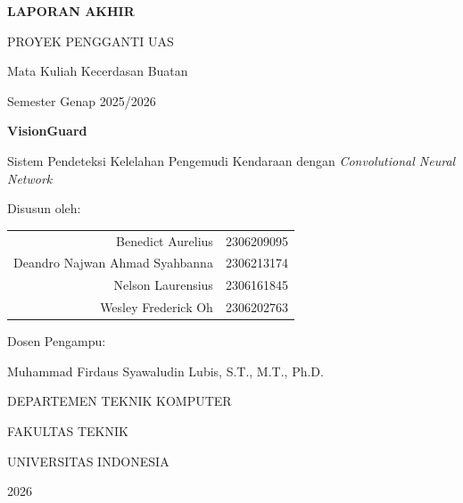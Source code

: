 \documentclass[11pt,a4paper,oneside]{report}
\begin{document}
\begin{titlepage}
\centering
\vspace*{1cm}

{\Large\bfseries LAPORAN AKHIR \par}
{\large PROYEK PENGGANTI UAS \par}
\vspace{0.3cm}
{\large Mata Kuliah Kecerdasan Buatan \par}
{\large Semester Genap 2025/2026 \par}

\vspace{2cm}


\vspace{1.5cm}

{\LARGE\bfseries VisionGuard \par}

\vspace{0.5cm}

{\large Sistem Pendeteksi Kelelahan Pengemudi Kendaraan dengan \textit{Convolutional Neural Network} \par}

\vspace{2cm}

{\large Disusun oleh: \par}

\vspace{0.5cm}

\begin{tabular}{rl}
Benedict Aurelius & 2306209095\\
Deandro Najwan Ahmad Syahbanna & 2306213174 \\
Nelson Laurensius & 2306161845 \\
Wesley Frederick Oh & 2306202763 \\
\end{tabular}

\vspace{1.5cm}

{\large Dosen Pengampu: \par}

{\large Muhammad Firdaus Syawaludin Lubis, S.T., M.T., Ph.D. \par}

\vfill

{\large DEPARTEMEN TEKNIK KOMPUTER \par}

{\large FAKULTAS TEKNIK \par}

{\large UNIVERSITAS INDONESIA \par}

{\large 2026 \par}
\end{titlepage}
\end{document}
